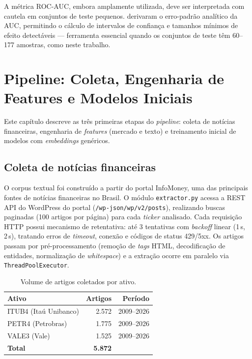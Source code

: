 \documentclass[
    12pt,
    openright,
    oneside,
    a4paper,
    english,
    brazil
]{abntex2}
\begin{document}
A métrica ROC-AUC, embora amplamente utilizada, deve ser interpretada com cautela em conjuntos de teste pequenos.  derivaram o erro-padrão analítico da AUC, permitindo o cálculo de intervalos de confiança e tamanhos mínimos de efeito detectáveis --- ferramenta essencial quando os conjuntos de teste têm 60--177 amostras, como neste trabalho.


\chapter{Pipeline: Coleta, Engenharia de Features e Modelos Iniciais}\label{cap:pipeline}

Este capítulo descreve as três primeiras etapas do \textit{pipeline}: coleta de notícias financeiras, engenharia de \textit{features} (mercado e texto) e treinamento inicial de modelos com \textit{embeddings} genéricos.

\section{Coleta de notícias financeiras}\label{sec:coleta}

O corpus textual foi construído a partir do portal InfoMoney, uma das principais fontes de notícias financeiras no Brasil. O módulo \texttt{extractor.py} acessa a REST API do WordPress do portal (\texttt{/wp-json/wp/v2/posts}), realizando buscas paginadas (100 artigos por página) para cada \textit{ticker} analisado. Cada requisição HTTP possui mecanismo de retentativa: até 3 tentativas com \textit{backoff} linear (1\,s, 2\,s), tratando erros de \textit{timeout}, conexão e códigos de status 429/5xx. Os artigos passam por pré-processamento (remoção de \textit{tags} HTML, decodificação de entidades, normalização de \textit{whitespace}) e a extração ocorre em paralelo via \texttt{ThreadPoolExecutor}.

\begin{table}[htb]
\centering
\caption{Volume de artigos coletados por ativo.}\label{tab:artigos}
\begin{tabular}{lrr}
\toprule
\textbf{Ativo} & \textbf{Artigos} & \textbf{Período} \\
\midrule
ITUB4 (Itaú Unibanco) & 2.572 & 2009--2026 \\
PETR4 (Petrobras)     & 1.775 & 2009--2026 \\
VALE3 (Vale)          & 1.525 & 2009--2026 \\
\midrule
\textbf{Total}        & \textbf{5.872} & \\
\bottomrule
\end{tabular}
\end{table}
\end{document}
